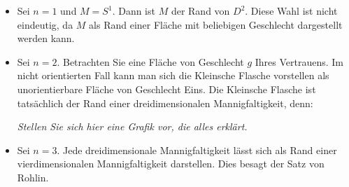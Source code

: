 \Bsp{}
\begin{itemize}
	\item Sei $n = 1$ und $M = S^1$. Dann ist $M$ der Rand von $D^2$. Diese Wahl ist nicht eindeutig, da $M$ als Rand einer Fläche mit beliebigen Geschlecht dargestellt werden kann.
	\item Sei $n=2$. Betrachten Sie eine Fläche von Geschlecht $g$ Ihres Vertrauens. Im nicht orientierten Fall kann man sich die Kleinsche Flasche vorstellen als unorientierbare Fläche von Geschlecht Eins. Die Kleinsche Flasche ist tatsächlich der Rand einer dreidimensionalen Mannigfaltigkeit, denn:
	\begin{center}
		\textit{Stellen Sie sich hier eine Grafik vor, die alles erklärt.}
	\end{center}
	\item Sei $n = 3$. Jede dreidimensionale Mannigfaltigkeit lässt sich als Rand einer vierdimensionalen Mannigfaltigkeit darstellen. Dies besagt der Satz von Rohlin.
\end{itemize}

